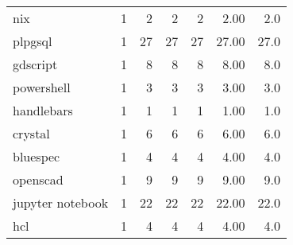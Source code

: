 \begin{tabular}{lrrrrrr}
nix              &          1 &           2 &    2 &    2 &   2.00 &      2.0 \\
plpgsql          &          1 &          27 &   27 &   27 &  27.00 &     27.0 \\
gdscript         &          1 &           8 &    8 &    8 &   8.00 &      8.0 \\
powershell       &          1 &           3 &    3 &    3 &   3.00 &      3.0 \\
handlebars       &          1 &           1 &    1 &    1 &   1.00 &      1.0 \\
crystal          &          1 &           6 &    6 &    6 &   6.00 &      6.0 \\
bluespec         &          1 &           4 &    4 &    4 &   4.00 &      4.0 \\
openscad         &          1 &           9 &    9 &    9 &   9.00 &      9.0 \\
jupyter notebook &          1 &          22 &   22 &   22 &  22.00 &     22.0 \\
hcl              &          1 &           4 &    4 &    4 &   4.00 &      4.0 \\
\bottomrule
\end{tabular}
